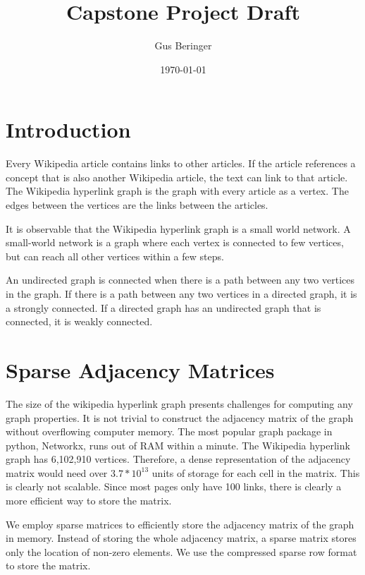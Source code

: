 \documentclass{article}
\author{Gus Beringer}
\title{Capstone Project Draft}
\date{\today}
\begin{document}
\maketitle

\section{Introduction}

Every Wikipedia article contains links to other articles. If the article references a concept that is also another Wikipedia article, the text can link to that article.
The Wikipedia hyperlink graph is the graph with every article as a vertex. The edges between the vertices are the links between the articles.

It is observable that the Wikipedia hyperlink graph is a small world network.
A small-world network is a graph where each vertex is connected to few vertices, but can reach all other vertices within a few steps.

An undirected graph is connected when there is a path between any two vertices in the graph.
If there is a path between any two vertices in a directed graph, it is a strongly connected.
If a directed graph has an undirected graph that is connected, it is weakly connected.


\section{Sparse Adjacency Matrices}

The size of the wikipedia hyperlink graph presents challenges for computing any graph properties.
It is not trivial to construct the adjacency matrix of the graph without overflowing computer memory.
The most popular graph package in python, Networkx, runs out of RAM within a minute.
The Wikipedia hyperlink graph has 6,102,910 vertices.
Therefore, a dense representation of the adjacency matrix would need over $3.7 * 10^{13}$ units of storage for each cell in the matrix.
This is clearly not scalable.
Since most pages only have 100 links, there is clearly a more efficient way to store the matrix.

We employ sparse matrices to efficiently store the adjacency matrix of the graph in memory.
Instead of storing the whole adjacency matrix, a sparse matrix stores only the location of non-zero elements.
We use the compressed sparse row format to store the matrix.
\end{document}
